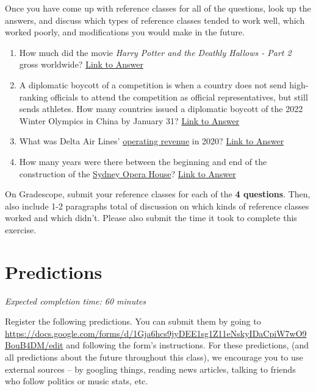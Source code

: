 \documentclass[11pt]{article}
\begin{document}
Once you have come up with reference classes for all of the questions, look up the answers, and discuss which types of reference classes tended to work well, which worked poorly, and modifications you would make in the future. 

\begin{enumerate}
	\item How much did the movie \emph{Harry Potter and the Deathly Hallows - Part 2} gross worldwide? \href{https://en.wikipedia.org/wiki/Harry_Potter_and_the_Deathly_Hallows_%E2%80%93_Part_2#Box_office}{Link to Answer}
	\item A diplomatic boycott of a competition is when a country does not send high-ranking officials to attend the competition as official representatives, but still sends athletes. How many countries issued a diplomatic boycott of the 2022 Winter Olympics in China by January 31? \href{https://en.wikipedia.org/wiki/2022_Winter_Olympics#Diplomatic_boycotts}{Link to Answer}
	\item What was Delta Air Lines' \href{https://www.investopedia.com/terms/o/operating-revenue.asp}{operating revenue} in 2020? \href{https://ir.delta.com/news/news-details/2021/Delta-Air-Lines-Announces-December-Quarter-and-Full-Year-2020-Financial-Results/default.aspx}{Link to Answer}
	\item How many years were there between the beginning and end of the construction of the \href{https://en.wikipedia.org/wiki/Sydney_Opera_House#/media/File:Sydney_Australia._(21339175489).jpg}{Sydney Opera House}? \href{https://en.wikipedia.org/wiki/Sydney_Opera_House}{Link to Answer}
	
\end{enumerate}

On Gradescope, submit your reference classes for each of the \textbf{4 questions}. Then, also include 1-2 paragraphs total of discussion on which kinds of reference classes worked and which didn't. Please also submit the time it took to complete this exercise.

\section*{Predictions}

\emph{Expected completion time: 60 minutes}

Register the following predictions. You can submit them by going to \url{https://docs.google.com/forms/d/1Gja6hcs9jyDEE1sg1Z11eNskyIDaCpiW7wO9BouB4DM/edit} and following the form's instructions. For these predictions, (and all predictions about the future throughout this class), we encourage you to use external sources -- by googling things, reading news articles, talking to friends who follow politics or music stats, etc.
\end{document}
